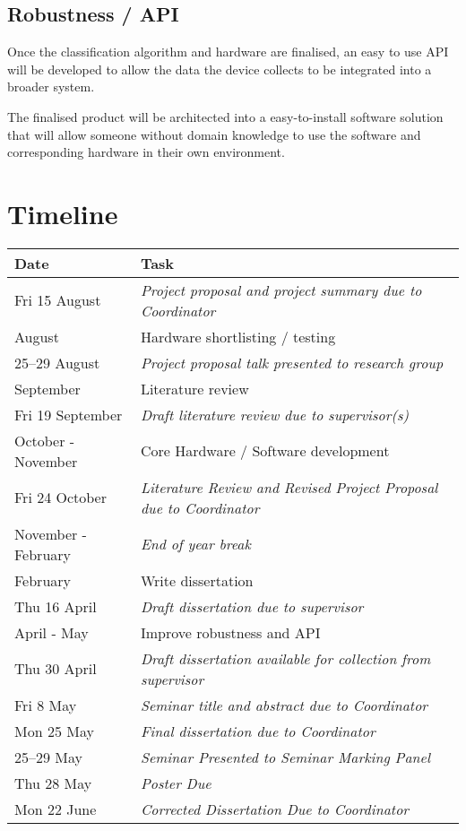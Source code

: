 \documentclass[../thesis/thesis.tex]{subfiles}
\begin{document}
\begin{bibunit}
\subsection{Robustness / API}
Once the classification algorithm and hardware are finalised, an easy to use API will be developed to allow the data the device collects to be integrated into a broader system.

The finalised product will be architected into a easy-to-install software solution that will allow someone without domain knowledge to use the software and corresponding hardware in their own environment.


\section{Timeline}

\begin{tabular}{ | l | p{9.8cm} |}
  \hline
  Date			& Task \\ \hline
  Fri 15 August 	& \emph{Project proposal and project summary due to Coordinator} \\ \hline
  August		& Hardware shortlisting / testing \\  \hline
  25--29 August 	& \emph{Project proposal talk presented to research group} \\ \hline
  September		& Literature review \\ \hline
  Fri 19 September 	& \emph{Draft literature review due to supervisor(s)} \\ \hline
  October - November	& Core Hardware / Software development \\ \hline
  Fri 24 October 	& \emph{Literature Review and Revised Project Proposal due to Coordinator} \\ \hline
  November - February	& \emph{End of year break} \\ \hline
  February		& Write dissertation \\ \hline
  Thu 16 April 		& \emph{Draft dissertation due to supervisor} \\ \hline
  April - May		& Improve robustness and API \\ \hline
  Thu 30 April 		& \emph{Draft dissertation available for collection from supervisor} \\ \hline
  Fri 8 May 		& \emph{Seminar title and abstract due to Coordinator} \\ \hline
  Mon 25 May 		& \emph{Final dissertation due to Coordinator} \\ \hline
  25--29 May		& \emph{Seminar Presented to Seminar Marking Panel} \\ \hline
  Thu 28 May 		& \emph{Poster Due} \\ \hline
  Mon 22 June		& \emph{Corrected Dissertation Due to Coordinator} \\
  \hline
\end{tabular}


\end{bibunit}
\end{document}
